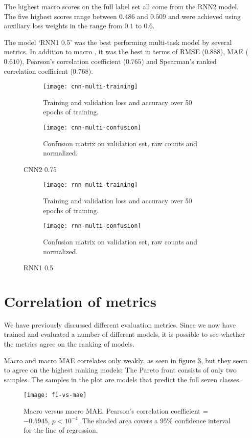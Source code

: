 The highest macro \FI scores on the full label set all come from the RNN2 model.
The five highest scores range between $0.486$ and $0.509$ and were achieved
using auxiliary loss weights in the range from $0.1$ to $0.6$.

The model `RNN1 0.5' was the best performing multi-task model by several
metrics. In addition to macro \FI, it was the best in terms of RMSE
($0.888$), MAE ($0.610$), Pearson's correlation coefficient ($0.765$) and
Spearman's ranked correlation coefficient ($0.768$).


\begin{figure}
  \begin{subfigure}{\linewidth}
    \centering
    \texttt{[image: cnn-multi-training]}
    \caption{Training and validation loss and accuracy over 50 epochs of training.}
  \end{subfigure}
  \begin{subfigure}{\linewidth}
    \centering
    \texttt{[image: cnn-multi-confusion]}
    \caption{Confusion matrix on validation set, raw counts and normalized.}
  \end{subfigure}
  \caption{CNN2 0.75}
  \label{fig:cnn-multi-training}
\end{figure}

\begin{figure}
  \begin{subfigure}{\linewidth}
    \centering
    \texttt{[image: rnn-multi-training]}
    \caption{Training and validation loss and accuracy over 50 epochs of training.}
  \end{subfigure}
  \begin{subfigure}{\linewidth}
    \centering
    \texttt{[image: rnn-multi-confusion]}
    \caption{Confusion matrix on validation set, raw counts and normalized.}
  \end{subfigure}
  \caption{RNN1 0.5}
  \label{fig:rnn-multi-training}
\end{figure}


\section{Correlation of metrics}


We have previously discussed different evaluation metrics. Since we now have
trained and evaluated a number of different models, it is possible to see
whether the metrics agree on the ranking of models.

Macro \FI and macro \ac{MAE} correlates only weakly, as seen in figure
\ref{fig:f1-vs-mae}, but they seem to agree on the highest ranking models:
The Pareto front consists of only two samples. The samples in the plot are
models that predict the full seven classes.

\begin{figure}
  \centering
  \texttt{[image: f1-vs-mae]}
  \caption[Macro \FI versus macro MAE]{
    Macro \FI versus macro MAE. Pearson's correlation coefficient = $-0.5945$,
    $p < 10^{-4}$. The shaded area covers a 95\% confidence interval for the
    line of regression.
  }
  \label{fig:f1-vs-mae}
\end{figure}
